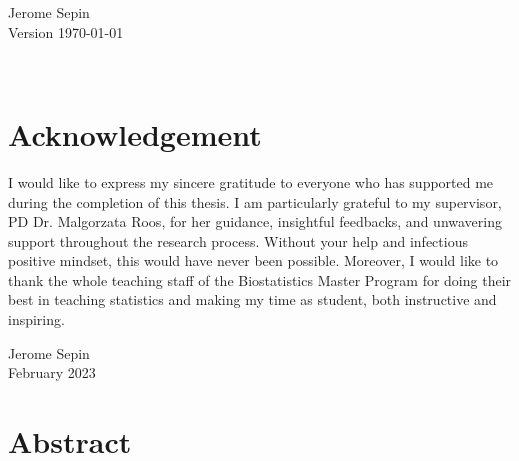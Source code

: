 \documentclass[11pt,a4paper,twoside]{book}\usepackage[]{graphicx}\usepackage[]{xcolor}
\begin{document}





\graphicspath{{./figure/}}
\setcounter{tocdepth}{2}

\thispagestyle{empty}
\begin{center}
  \vspace*{6cm}{\bfseries\Huge
  Assessment of the detrimental effects\\[5mm] of collinearity in \\[5mm] classical and transformation models
  }
  \vfill
  \rm

  \LARGE
  Jerome Sepin\\[12mm]
  
  \normalsize
  Version \today
\end{center}
\newpage
\thispagestyle{empty}~
\newpage
{}

\chapter*{Acknowledgement}
I would like to express my sincere gratitude to everyone who has supported me during the completion of this thesis.
I am particularly grateful to my supervisor, PD Dr. Malgorzata Roos, for her guidance, insightful feedbacks, and unwavering support throughout the research process.
Without your help and infectious positive mindset, this would have never been possible.
Moreover, I would like to thank the whole teaching staff of the Biostatistics Master Program for doing their best in teaching statistics and making my time as student, both instructive and inspiring.

\bigskip
\begin{flushright}
  Jerome Sepin\\
  February 2023
\end{flushright}


\thispagestyle{plain}
\tableofcontents
{}

\chapter*{Abstract}
\thispagestyle{plain}
\end{document}
